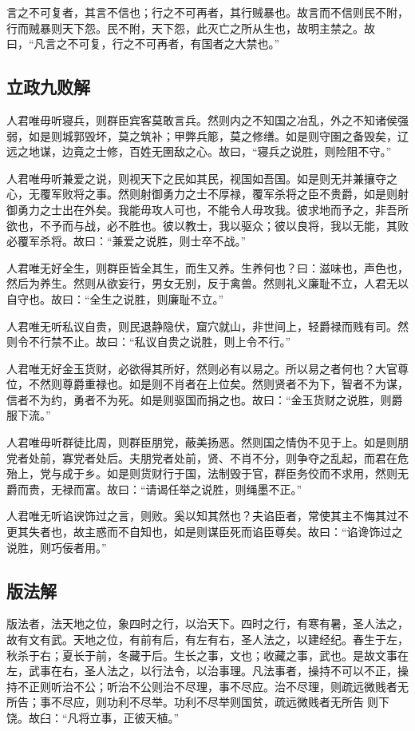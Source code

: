 \documentclass[]{article}
\begin{document}
言之不可复者，其言不信也；行之不可再者，其行贼暴也。故言而不信则民不附，行而贼暴则天下怨。民不附，天下怨，此灭亡之所从生也，故明主禁之。故曰，``凡言之不可复，行之不可再者，有国者之大禁也。''

\hypertarget{header-n874}{%
\subsection{立政九败解}\label{header-n874}}

人君唯毋听寝兵，则群臣宾客莫敢言兵。然则内之不知国之冶乱，外之不知诸侯强弱，如是则城郭毁坏，莫之筑补；甲弊兵簓，莫之修缮。如是则守圉之备毁矣，辽远之地谋，边竟之士修，百姓无圉敌之心。故曰，``寝兵之说胜，则险阻不守。''

人君唯毋听兼爱之说，则视天下之民如其民，视国如吾国。如是则无并兼攘夺之心，无覆军败将之事。然则射御勇力之士不厚禄，覆军杀将之臣不贵爵，如是则射御勇力之士出在外矣。我能毋攻人可也，不能令人毋攻我。彼求地而予之，非吾所欲也，不予而与战，必不胜也。彼以教士，我以驱众；彼以良将，我以无能，其败必覆军杀将。故曰：``兼爱之说胜，则士卒不战。''

人君唯无好全生，则群臣皆全其生，而生又养。生养何也？曰：滋味也，声色也，然后为养生。然则从欲妄行，男女无别，反于禽兽。然则礼义廉耻不立，人君无以自守也。故曰：``全生之说胜，则廉耻不立。''

人君唯无听私议自贵，则民退静隐伏，窟穴就山，非世间上，轻爵禄而贱有司。然则令不行禁不止。故曰：``私议自贵之说胜，则上令不行。''

人君唯无好金玉货财，必欲得其所好，然则必有以易之。所以易之者何也？大官尊位，不然则尊爵重禄也。如是则不肖者在上位矣。然则贤者不为下，智者不为谋，信者不为约，勇者不为死。如是则驱国而捐之也。故曰：``金玉货财之说胜，则爵服下流。''

人君唯毋听群徒比周，则群臣朋党，蔽美扬恶。然则国之情伪不见于上。如是则朋党者处前，寡党者处后。夫朋党者处前，贤、不肖不分，则争夺之乱起，而君在危殆上，党与成于乡。如是则货财行于国，法制毁于官，群臣务佼而不求用，然则无爵而贵，无禄而富。故曰：``请谒任举之说胜，则绳墨不正。''

人君唯无听谄谀饰过之言，则败。奚以知其然也？夫谄臣者，常使其主不悔其过不更其失者也，故主惑而不自知也，如是则谋臣死而谄臣尊矣。故曰：``谄谗饰过之说胜，则巧佞者用。''

\hypertarget{header-n884}{%
\subsection{版法解}\label{header-n884}}

版法者，法天地之位，象四时之行，以治天下。四时之行，有寒有暑，圣人法之，故有文有武。天地之位，有前有后，有左有右，圣人法之，以建经纪。春生于左，秋杀于右；夏长于前，冬藏于后。生长之事，文也；收藏之事，武也。是故文事在左，武事在右，圣人法之，以行法令，以治事理。凡法事者，操持不可以不正，操持不正则听治不公；听治不公则治不尽理，事不尽应。治不尽理，则疏远微贱者无所告；事不尽应，则功利不尽举。功利不尽举则国贫，疏远微贱者无所告则下饶。故臼：``凡将立事，正彼天植。''
\end{document}
